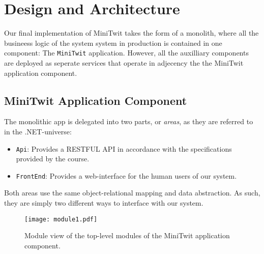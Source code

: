 \section{Design and Architecture}\label{sec:design-arch}

Our final implementation of MiniTwit takes the form of a monolith, where all the busineess logic of the system system in production is contained in one component: The \texttt{MiniTwit} application.
However, all the auxilliary components are deployed as seperate services that operate in adjecency the the MiniTwit application component.

\subsection{MiniTwit Application Component}

The monolithic app is delegated into two parts, or \textit{areas}, as they are referred to in the .NET-universe:

\begin{itemize}
	\item \texttt{Api}: Provides a RESTFUL API in accordance with the specifications provided by the course. %
	\item \texttt{FrontEnd}: Provides a web-interface for the human users of our system. %
\end{itemize}

Both areas use the same object-relational mapping and data abstraction. As such, they are simply two different ways to interface with our system.

\begin{figure}
	\begin{center}
		\texttt{[image: module1.pdf]}
	\end{center}
	\caption{Module view of the top-level modules of the MiniTwit application component.}\label{fig:module1}
\end{figure}



